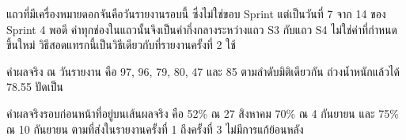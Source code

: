 แถวที่มีเครื่องหมายดอกจันคือวันรายงานรอบนี้ ซึ่งไม่ใช่ขอบ Sprint แต่เป็นวันที่ 7 จาก 14 ของ Sprint 4 พอดี ค่าทุกช่องในแถวนั้นจึงเป็นค่ากึ่งกลางระหว่างแถว S3 กับแถว S4 ไม่ใช่ค่าที่กำหนดขึ้นใหม่ วิธีสอดแทรกนี้เป็นวิธีเดียวกับที่รายงานครั้งที่ 2 ใช้

ค่าผลจริง ณ วันรายงาน คือ 97, 96, 79, 80, 47 และ 85 ตามลำดับมิติเดียวกัน ถ่วงน้ำหนักแล้วได้ 78.55 ปัดเป็น \actualpct

ค่าผลจริงรอบก่อนหน้าที่อยู่บนเส้นผลจริง คือ 52\% ณ 27 สิงหาคม 70\% ณ 4 กันยายน และ 75\% ณ 10 กันยายน ตามที่ส่งในรายงานครั้งที่ 1 ถึงครั้งที่ 3 ไม่มีการแก้ย้อนหลัง


